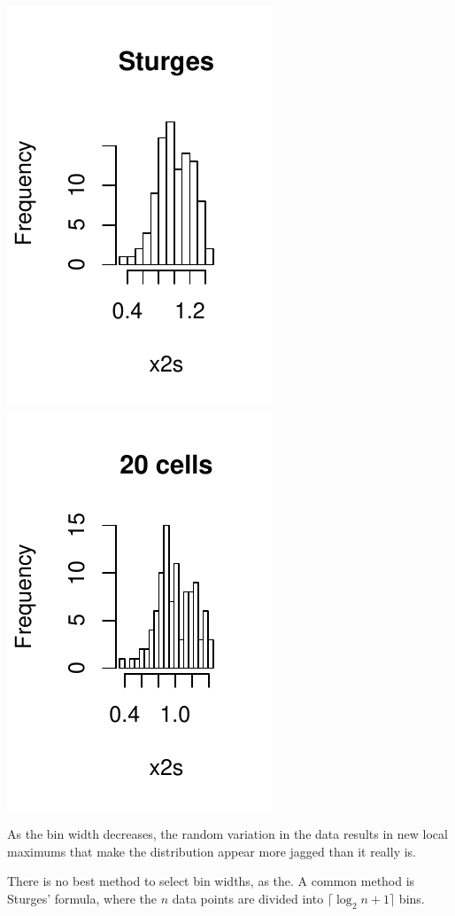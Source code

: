 \documentclass[a4paper, oneside, final]{memoir}
\begin{document}
\includegraphics{img/question15-plot-2-b.pdf}
\includegraphics{img/question15-plot-2-c.pdf}

As the bin width decreases, the random variation in the data results
in new local maximums that make the distribution appear more jagged
than it really is.

There is no best method to select bin widths, as the.  A common
method is Sturges' formula, where the $n$ data points are divided into
$\lceil\log_2n+1 \rceil$ bins.
\end{document}
